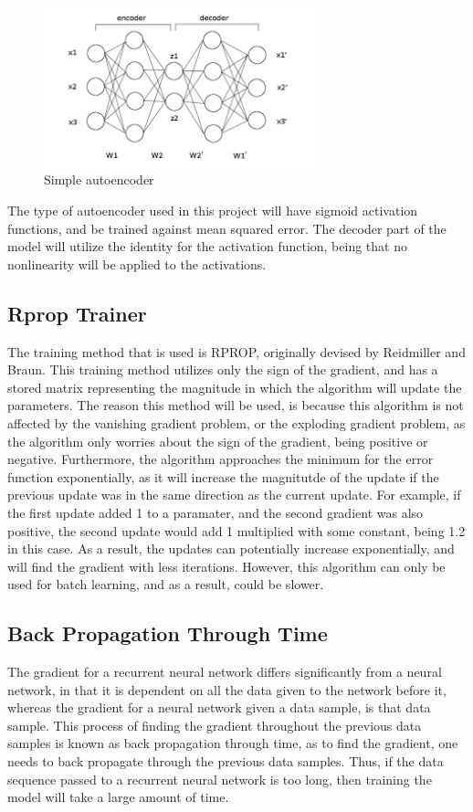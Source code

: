 \documentclass{article}
\begin{document}
\begin{figure}[H]
	\centering
	\caption{Simple autoencoder}
	\includegraphics[width=0.7\textwidth]{autoencoderDiagram.jpg}
\end{figure}

The type of autoencoder used in this project will have sigmoid activation
functions, and be trained against mean squared error. The decoder part of the
model will utilize the identity for the activation function, being that no
nonlinearity will be applied to the activations.

\subsection{Rprop Trainer}
The training method that is used is RPROP, originally devised by Reidmiller and
Braun. This training method utilizes only the sign of the gradient, and has a
stored matrix representing the magnitude in which the algorithm will update the
parameters. The reason this method will be used, is because this algorithm is
not affected by the vanishing gradient problem, or the exploding gradient
problem, as the algorithm only worries about the sign of the gradient, being
positive or negative. Furthermore, the algorithm approaches the minimum for the
error function exponentially, as it will increase the magnitutde of the update
if the previous update was in the same direction as the current update. For
example, if the first update added 1 to a paramater, and the second gradient was
also positive, the second update would add 1 multiplied with some constant,
being 1.2 in this case. As a result, the updates can potentially increase
exponentially, and will find the gradient with less iterations. However, this
algorithm can only be used for batch learning, and as a result, could be slower.

\subsection{Back Propagation Through Time}
The gradient for a recurrent neural network differs significantly from a neural
network, in that it is dependent on all the data given to the network before it,
whereas the gradient for a neural network given a data sample, is that data
sample. This process of finding the gradient throughout the previous data
samples is known as back propagation through time, as to find the gradient, one
needs to back propagate through the previous data samples. Thus, if the data
sequence passed to a recurrent neural network is too long, then training the
model will take a large amount of time.
\end{document}
